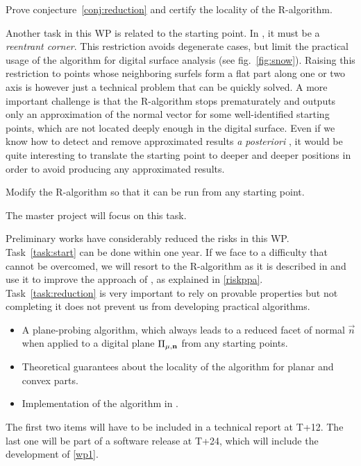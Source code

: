\begin{Task}
  \label{task:reduction}
  Prove conjecture~\ref{conj:reduction} and certify the locality of the R-algorithm. 
\end{Task}

Another task in this WP is related to the starting point. In \cite{LPRJMIV2017},
it must be a \emph{reentrant corner}. This restriction avoids degenerate cases, but
limit the practical usage of the algorithm for digital surface analysis
(see fig.~\ref{fig:snow}). Raising this restriction to points whose neighboring
surfels form a flat part along one or two axis is however just a technical
problem that can be quickly solved. A more important challenge is that the R-algorithm
stops prematurately and outputs only an approximation of the normal vector for some
well-identified starting points, which are not located deeply enough in the digital
surface. Even if we know how to detect and remove approximated results
\emph{a posteriori} \cite{LPRJMIV2017}, it would be quite interesting to translate
the starting point to deeper and deeper positions in order to avoid producing any
approximated results.

\begin{Task}
  \label{task:start}
  Modify the R-algorithm so that it can be run from any starting point. 
\end{Task}

The master project will focus on this task. %

\Risks
Preliminary works have considerably reduced the risks in this WP. Task~\ref{task:start}
can be done within one year. If we face to a difficulty that cannot be overcomed,
we will resort to the R-algorithm as it is described in \cite{LPRJMIV2017} and use it
to improve the approach of \citeauthor*{Charrier2011} \cite{Charrier2011}, as explained
in \ref{riskppa}. Task~\ref{task:reduction} is very important to rely on provable
properties but not completing it does not prevent us from developing practical algorithms.

\Success
\begin{itemize}
    \item A plane-probing algorithm, which always leads to a
      reduced facet of normal $\vec{n}$ when applied to a digital
      plane $\Pi_{\mu,\mathbf{n}}$ from any starting points.
    \item Theoretical guarantees about the locality of the algorithm
      for planar and convex parts.   
    \item Implementation of the algorithm in \DGtal.   
\end{itemize}
The first two items will have to be included in a technical report at T+12.
The last one will be part of a software release at T+24, which will include
the development of \ref{wp1}. 

